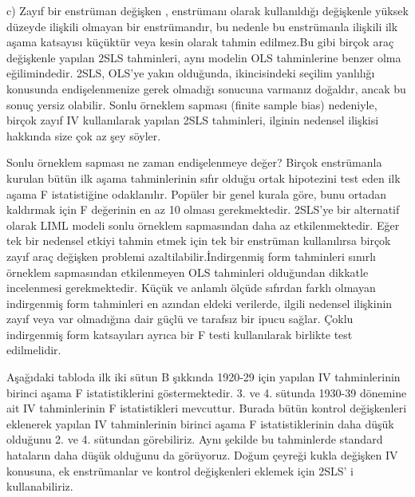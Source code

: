 \documentclass[a4paper]{article}
\begin{document}
c) Zayıf bir enstrüman değişken , enstrümanı olarak kullanıldığı değişkenle yüksek düzeyde ilişkili olmayan bir enstrümandır, bu nedenle bu enstrümanla ilişkili ilk aşama katsayısı küçüktür veya kesin olarak tahmin edilmez.Bu gibi birçok araç değişkenle yapılan 2SLS tahminleri, aynı modelin OLS tahminlerine benzer olma eğilimindedir. 2SLS, OLS'ye yakın olduğunda, ikincisindeki seçilim yanlılığı konusunda endişelenmenize gerek olmadığı sonucuna varmanız doğaldır, ancak bu sonuç yersiz olabilir. Sonlu örneklem sapması (finite sample bias) nedeniyle, birçok zayıf IV kullanılarak yapılan  2SLS tahminleri, ilginin nedensel ilişkisi hakkında size çok az şey söyler.
\item
Sonlu örneklem sapması ne zaman endişelenmeye değer? Birçok enstrümanla kurulan bütün ilk aşama tahminlerinin sıfır olduğu ortak hipotezini test eden ilk aşama F istatistiğine odaklanılır. Popüler bir genel kurala göre, bunu ortadan kaldırmak için F değerinin en az 10 olması gerekmektedir.  2SLS'ye bir alternatif olarak LIML modeli sonlu örneklem sapmasından daha az etkilenmektedir. Eğer tek bir nedensel etkiyi tahmin etmek için tek bir enstrüman kullanılırsa birçok zayıf araç değişken problemi azaltilabilir.İndirgenmiş form tahminleri sınırlı örneklem sapmasından etkilenmeyen OLS tahminleri olduğundan dikkatle incelenmesi gerekmektedir. Küçük ve anlamlı ölçüde sıfırdan farklı olmayan indirgenmiş form tahminleri en azından eldeki verilerde, ilgili nedensel ilişkinin zayıf veya var olmadığına dair güçlü ve tarafsız bir ipucu sağlar. Çoklu indirgenmiş form katsayıları ayrıca bir F testi kullanılarak birlikte test edilmelidir.
\item
Aşağıdaki tabloda ilk iki sütun B şıkkında 1920-29 için yapılan IV tahminlerinin birinci aşama F istatistiklerini göstermektedir. 3. ve 4. sütunda 1930-39 dönemine ait IV tahminlerinin F istatistikleri mevcuttur. Burada bütün kontrol değişkenleri eklenerek yapılan IV tahminlerinin birinci aşama F istatistiklerinin daha düşük olduğunu 2. ve 4. sütundan görebiliriz. Aynı şekilde bu tahminlerde standard hataların daha düşük olduğunu da görüyoruz.
Doğum çeyreği kukla değişken IV konusuna, ek enstrümanlar ve kontrol değişkenleri eklemek için 2SLS' i  kullanabiliriz.
\item
 \item
 \item
                      \\
     
 \\ \\
 \item
\end{document}
